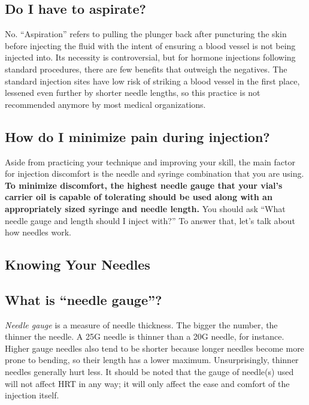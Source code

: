 \documentclass{article}
\begin{document}
\subsection{Do I have to aspirate?}

No. “Aspiration” refers to pulling the plunger back after puncturing the skin before injecting the fluid with the intent of ensuring a blood vessel is not being injected into. Its necessity is controversial, but for hormone injections following standard procedures, there are few benefits that outweigh the negatives. The standard injection sites have low risk of striking a blood vessel in the first place, lessened even further by shorter needle lengths, so this practice is not recommended anymore by most medical organizations.

\subsection{How do I minimize pain during injection?}

Aside from practicing your technique and improving your skill, the main factor for injection discomfort is the needle and syringe combination that you are using. \textbf{To minimize discomfort, the highest needle gauge that your vial’s carrier oil is capable of tolerating should be used along with an appropriately sized syringe and needle length. }You should ask “What needle gauge and length should I inject with?” To answer that, let’s talk about how needles work.

\subsection*{Knowing Your Needles}

\subsection{What is “needle gauge”?}

\textit{Needle gauge }is a measure of needle thickness. The bigger the number, the thinner the needle. A 25G needle is thinner than a 20G needle, for instance. Higher gauge needles also tend to be shorter because longer needles become more prone to bending, so their length has a lower maximum. Unsurprisingly, thinner needles generally hurt less. It should be noted that the gauge of needle(s) used will not affect HRT in any way; it will only affect the ease and comfort of the injection itself.
\end{document}

